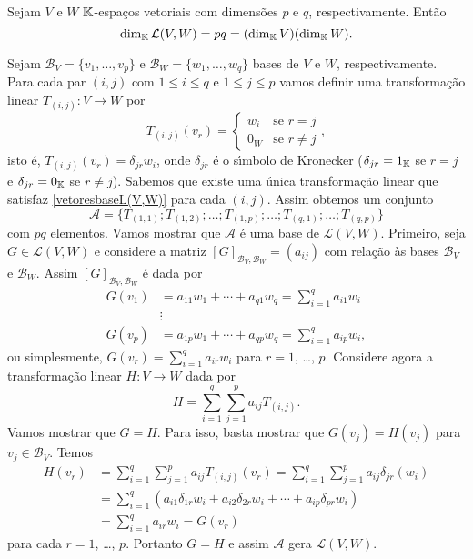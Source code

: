 \begin{teorema}
	Sejam $V$ e $W$ $\mathbb{K}$-espa\c{c}os vetoriais  com dimens\~oes $p$ e $q$, respectivamente. Ent\~ao
	\[
		\dim_{\mathbb{K}}\mathcal{L}(V,W) = pq = (\dim_{\mathbb{K}}V)(\dim_{\mathbb{K}}W).
	\]
\end{teorema}
\begin{prova}
	Sejam $\mathcal{B}_V = \{v_1,\dots,v_p\}$ e $\mathcal{B}_W = \{w_1,\dots,w_q\}$ bases de $V$ e $W$, respectivamente. Para cada par $(i,j)$ com $1 \le i \le q$ e $1 \le j \le p$ vamos definir uma transforma\c{c}\~ao linear $T_{(i,j)} : V \to W$ por
	\begin{equation}\label{vetoresbaseL(V,W)}
		T_{(i,j)}(v_r) = \begin{cases}
			w_i & \mbox{se } r = j\\
			0_W & \mbox{se } r \ne j
		\end{cases},
	\end{equation}
	isto \'e, $T_{(i,j)}(v_r) = \delta_{jr}w_i$, onde $\delta_{jr}$ \'e o s{\'\i}mbolo de Kronecker ($\delta_{jr} = 1_{\mathbb{K}}$ se $r = j$ e $\delta_{jr} = 0_{\mathbb{K}}$ se $r \ne j$). Sabemos que existe uma \'unica transforma\c{c}\~ao linear que satisfaz \eqref{vetoresbaseL(V,W)} para cada $(i,j)$. Assim obtemos um conjunto
	\begin{equation}\label{baseL(V,W)}
		\mathcal{A} = \{T_{(1,1)}; T_{(1,2)};\dots;T_{(1,p)};\dots;T_{(q,1)};\dots;T_{(q,p)}\}
	\end{equation}
	com $pq$ elementos. Vamos mostrar que $\mathcal{A}$ \'e uma base de $\mathcal{L}(V,W)$. Primeiro, seja $G \in \mathcal{L}(V,W)$ e considere a matriz $[G]_{\mathcal{B}_V,\mathcal{B}_W} = (a_{ij})$ com rela\c{c}\~ao \`as bases $\mathcal{B}_V$ e $\mathcal{B}_W$. Assim $[G]_{\mathcal{B}_V,\mathcal{B}_W}$ \'e dada por
	\begin{align*}
		G(v_1) &= a_{11}w_1 + \cdots + a_{q1}w_q = \sum_{i = 1}^qa_{i1}w_i\\
		&\vdots\\
		G(v_p) &= a_{1p}w_1 + \cdots + a_{qp}w_q = \sum_{i = 1}^qa_{ip}w_i,
	\end{align*}
	ou simplesmente, $G(v_r) = \sum_{i = 1}^qa_{ir}w_i$ para $r = 1$, \dots, $p$. Considere agora a transforma\c{c}\~ao linear $H : V \to W$ dada por
	\[
		H = \sum_{i = 1}^q\sum_{j = 1}^pa_{ij}T_{(i,j)}.
	\]
	Vamos mostrar que $G = H$. Para isso, basta mostrar que $G(v_j) = H(v_j)$ para $v_j \in \mathcal{B}_V$. Temos
	\begin{align*}
		H(v_r) &= \sum_{i = 1}^q\sum_{j = 1}^pa_{ij}T_{(i,j)}(v_r) = \sum_{i = 1}^q\sum_{j = 1}^pa_{ij}\delta_{jr}(w_i)\\ &= \sum_{i = 1}^q(a_{i1}\delta_{1r}w_i + a_{i2}\delta_{2r}w_i + \cdots + a_{ip}\delta_{pr}w_i)\\ &= \sum_{i = 1}^qa_{ir}w_i = G(v_r)
	\end{align*}
	para cada $r = 1$, \dots, $p$. Portanto $G = H$ e assim $\mathcal{A}$ gera $\mathcal{L}(V,W)$.


\end{prova}
